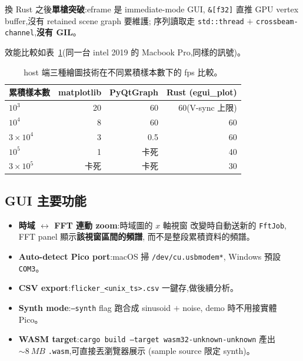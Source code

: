 \documentclass[12pt,a4paper]{article}
\begin{document}
換 Rust 之後\textbf{單槍突破}:eframe 是 immediate-mode GUI,
\texttt{\&[f32]} 直推 GPU vertex buffer,沒有 retained scene graph 要維護;
序列讀取走 \texttt{std::thread} \(+\) \texttt{crossbeam-channel},\textbf{沒有 GIL}。

效能比較如表~\ref{tab:fps}(同一台 intel 2019 的 Macbook Pro,同樣的訊號)。

\begin{table}[H]
	\centering
	\caption{host 端三種繪圖技術在不同累積樣本數下的 fps 比較。}
	\label{tab:fps}
	\begin{tabular}{lrrr}
		\toprule
		累積樣本數             & matplotlib & PyQtGraph & Rust (egui\_plot) \\
		\midrule
		\(10^3\)          & 20         & 60        & 60(V-sync 上限)     \\
		\(10^4\)          & 8          & 60        & 60                \\
		\(3 \times 10^4\) & 3          & 0.5       & 60                \\
		\(10^5\)          & 1          & 卡死        & 40                \\
		\(3 \times 10^5\) & 卡死         & 卡死        & 30                \\
		\bottomrule
	\end{tabular}
\end{table}

\subsection{GUI 主要功能}

\begin{itemize}[leftmargin=2em,itemsep=0pt]
	\item \textbf{時域 \(\leftrightarrow\) FFT 連動 zoom}:時域圖的 \(x\) 軸視窗
	      改變時自動送新的 \texttt{FftJob}, FFT panel 顯示\textbf{該視窗區間的頻譜},
	      而不是整段累積資料的頻譜。
	\item \textbf{Auto-detect Pico port}:macOS 掃 \texttt{/dev/cu.usbmodem*},
	      Windows 預設 \texttt{COM3}。
	\item \textbf{CSV export}:\texttt{flicker\_<unix\_ts>.csv} 一鍵存,做後續分析。
	\item \textbf{Synth mode}:\texttt{--synth} flag 跑合成 sinusoid \(+\) noise,
	      demo 時不用接實體 Pico。
	\item \textbf{WASM target}:\texttt{cargo build --target wasm32-unknown-unknown}
	      產出 \(\sim \SI{8}{MB}\) \texttt{.wasm},可直接丟瀏覽器展示
	      (sample source 限定 synth)。
\end{itemize}
\end{document}
